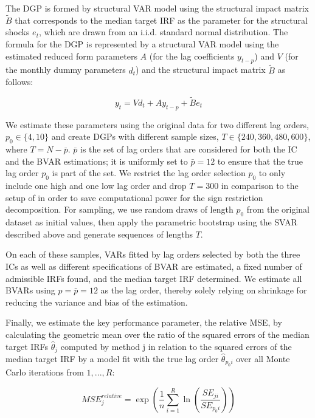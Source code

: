 \documentclass[12pt, a4paper]{article}
\begin{document}
The DGP is formed by structural VAR model using the structural impact matrix $\tilde{B}$ that corresponds to the median target IRF as the parameter for the structural shocks $e_t$, which are drawn from an i.i.d. standard normal distribution. The formula for the DGP is represented by a structural VAR model using the estimated reduced form parameters $A$ (for the lag coefficients $y_{t-p}$) and $V$ (for the monthly dummy parameters $d_t$) and the structural impact matrix $\tilde{B}$ as follows:

\begin{equation}
    y_t = V d_t + A y_{t-p} + \tilde{B} e_t
\end{equation}

We estimate these parameters using the original data for two different lag orders, $p_0 \in \{4,10\}$ and create DGPs with different sample sizes, $T \in \{240, 360, 480, 600\}$, where $T=N-\bar{p}$. $\bar{p}$ is the set of lag orders that are considered for both the IC and the BVAR estimations; it is uniformly set to $\bar{p}=12$ to ensure that the true lag order $p_0$ is part of the set. We restrict the lag order selection $p_0$ to only include one high and one low lag order and drop $T=300$ in comparison to the setup of \citet{ivanovPractitionersGuideLag2005} in order to save computational power for the sign restriction decomposition. For sampling, we use random draws of length $p_0$ from the original dataset as initial values, then apply the parametric bootstrap using the SVAR described above and generate sequences of lengths $T$.

On each of these samples, VARs fitted by lag orders selected by both the three ICs as well as different specifications of BVAR are estimated, a fixed number of admissible IRFs found, and the median target IRF determined. We estimate all BVARs using $p=\bar{p}=12$ as the lag order, thereby solely relying on shrinkage for reducing the variance and bias of the estimation. 

Finally, we estimate the key performance parameter, the relative MSE, by calculating the geometric mean over the ratio of the squared errors of the median target IRFs $\hat \theta_j$ computed by method j in relation to the squared errors of the median target IRF by a model fit with the true lag order $\hat \theta_{p_0i}$ over all Monte Carlo iterations from $1, ..., R$:

\begin{equation}
    MSE^{relative}_j = \exp\left( \frac{1}{n} \sum_{i=1}^{R} \ln(\frac{SE_{ji}}{SE_{p_0i}}) \right)
\end{equation}
\end{document}
